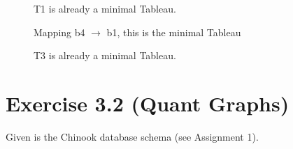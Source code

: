 \documentclass[10pt]{article}
\begin{document}
	\begin{figure}[!htb]
		\centering
		\begin{minipage}[t]{0.29\textwidth}
			T1 is already a minimal Tableau.
		\end{minipage}
		\begin{minipage}[t]{0.05\textwidth}
			\hspace{0.01mm}
		\end{minipage}
		\begin{minipage}[t]{0.29\textwidth}
			Mapping b4 $\rightarrow$ b1, this is the minimal Tableau
		\end{minipage}
		\begin{minipage}[t]{0.05\textwidth}
			\hspace{0.01mm}
		\end{minipage}
		\begin{minipage}[t]{0.29\textwidth}
			 T3 is already a minimal Tableau.
		\end{minipage}
	\end{figure}
		
	
	
	\clearpage


	\section*{Exercise 3.2 (Quant Graphs)}
		Given is the Chinook database schema (see Assignment 1).
		
\end{document}
